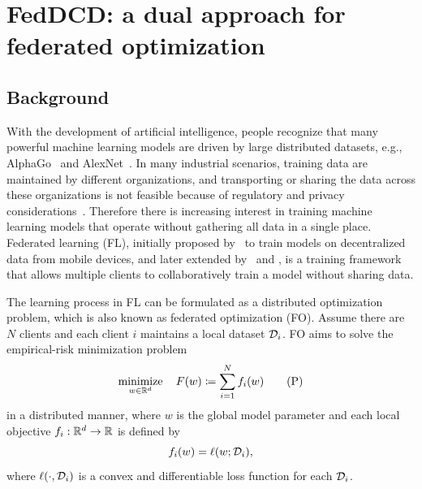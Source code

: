 \chapter{FedDCD: a dual approach for federated optimization}
\label{ch:Dual-Fed-Opt}

\section{Background} \label{sec:6-intro}

With the development of artificial intelligence, people recognize that many powerful machine learning models are driven by large distributed datasets, e.g., AlphaGo~\citep{silver2016mastering} and AlexNet~\citep{krizhevsky2012imagenet}. In many industrial scenarios, training data are maintained by different organizations, and transporting or sharing the data across these organizations is not feasible because of regulatory and privacy considerations~\citep{li2020review}. Therefore there is increasing interest in training machine learning models that operate without gathering all data in a single place.
Federated learning (FL), initially proposed by~\citet{mcmahan2017communication} to train models on decentralized data from mobile devices, and later extended by~\citet{yang2019federated} and \citet{kairouz2019advances}, is a training framework that allows multiple clients to collaboratively train a model without sharing data. 

The learning process in FL can be formulated as a distributed optimization problem, which is also known as federated optimization (FO). Assume there are $N$ clients and each client $i$ maintains a local dataset $\mathcal{D}_i$. FO aims to solve the  empirical-risk minimization problem
\begin{equation} \label{eq:primal}
  \displaystyle\mathop{\hbox{\rm minimize}}_{w\in\mathbb{R}^d}\enspace\enspace F(w) \coloneqq \sum_{i = 1}^N f_i(w) \tag{P}
\end{equation}
in a distributed manner, where $w$ is the global model parameter and each local objective $f_i:\mathbb{R}^d \to\mathbb{R}$ is defined by 
\begin{equation*} %
    f_i(w) = \ell(w; \Dscr_i),
\end{equation*}
where $\ell(\cdot, \mathcal{D}_i)$ is a convex and differentiable loss function for each $\mathcal{D}_i$. 

